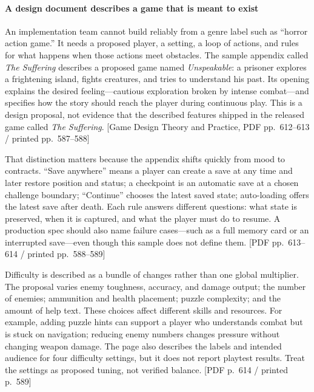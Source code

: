 \paragraph{A design document describes a game that is meant to exist}\label{05-engine-i-ch009-a-design-document-describes-a-game-that-is-meant-to-exist}

\hypertarget{05-engine-i-ch009-a-design-document-describes-a-game-that-is-meant-to-exist}{}

An implementation team cannot build reliably from a genre label such as ``horror action game.'' It needs a proposed player, a setting, a loop of actions, and rules for what happens when those actions meet obstacles. The sample appendix called \emph{The Suffering} describes a proposed game named \emph{Unspeakable}: a prisoner explores a frightening island, fights creatures, and tries to understand his past. Its opening explains the desired feeling---cautious exploration broken by intense combat---and specifies how the story should reach the player during continuous play. This is a design proposal, not evidence that the described features shipped in the released game called \emph{The Suffering}. {[}Game Design Theory and Practice, PDF pp.~612--613 / printed pp.~587--588{]}

That distinction matters because the appendix shifts quickly from mood to contracts. ``Save anywhere'' means a player can create a save at any time and later restore position and status; a checkpoint is an automatic save at a chosen challenge boundary; ``Continue'' chooses the latest saved state; auto-loading offers the latest save after death. Each rule answers different questions: what state is preserved, when it is captured, and what the player must do to resume. A production spec should also name failure cases---such as a full memory card or an interrupted save---even though this sample does not define them. {[}PDF pp.~613--614 / printed pp.~588--589{]}

Difficulty is described as a bundle of changes rather than one global multiplier. The proposal varies enemy toughness, accuracy, and damage output; the number of enemies; ammunition and health placement; puzzle complexity; and the amount of help text. These choices affect different skills and resources. For example, adding puzzle hints can support a player who understands combat but is stuck on navigation; reducing enemy numbers changes pressure without changing weapon damage. The page also describes the labels and intended audience for four difficulty settings, but it does not report playtest results. Treat the settings as proposed tuning, not verified balance. {[}PDF p.~614 / printed p.~589{]}

